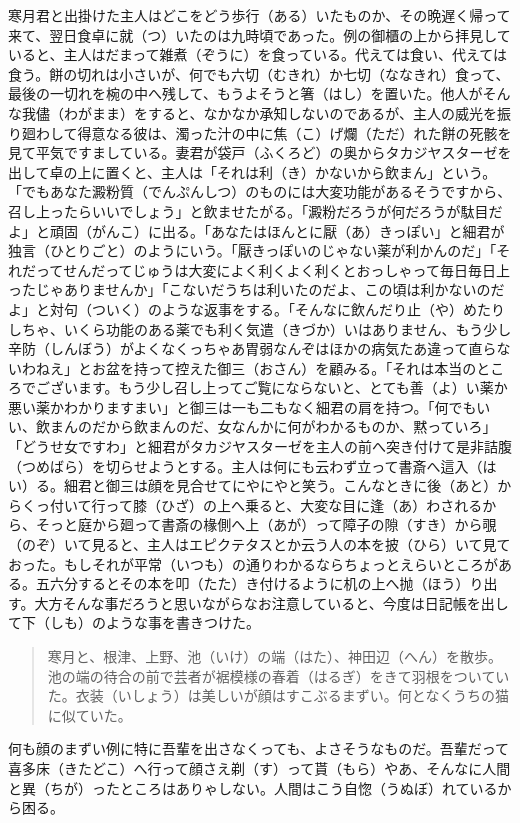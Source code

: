 \documentclass{book}
\begin{document}
寒月君と出掛けた主人はどこをどう歩行（ある）いたものか、その晩遅く帰って来て、翌日食卓に就（つ）いたのは九時頃であった。例の御櫃の上から拝見していると、主人はだまって雑煮（ぞうに）を食っている。代えては食い、代えては食う。餅の切れは小さいが、何でも六切（むきれ）か七切（ななきれ）食って、最後の一切れを椀の中へ残して、もうよそうと箸（はし）を置いた。他人がそんな我儘（わがまま）をすると、なかなか承知しないのであるが、主人の威光を振り廻わして得意なる彼は、濁った汁の中に焦（こ）げ爛（ただ）れた餅の死骸を見て平気ですましている。妻君が袋戸（ふくろど）の奥からタカジヤスターゼを出して卓の上に置くと、主人は「それは利（き）かないから飲まん」という。「でもあなた澱粉質（でんぷんしつ）のものには大変功能があるそうですから、召し上ったらいいでしょう」と飲ませたがる。「澱粉だろうが何だろうが駄目だよ」と頑固（がんこ）に出る。「あなたはほんとに厭（あ）きっぽい」と細君が独言（ひとりごと）のようにいう。「厭きっぽいのじゃない薬が利かんのだ」「それだってせんだってじゅうは大変によく利くよく利くとおっしゃって毎日毎日上ったじゃありませんか」「こないだうちは利いたのだよ、この頃は利かないのだよ」と対句（ついく）のような返事をする。「そんなに飲んだり止（や）めたりしちゃ、いくら功能のある薬でも利く気遣（きづか）いはありません、もう少し辛防（しんぼう）がよくなくっちゃあ胃弱なんぞはほかの病気たあ違って直らないわねえ」とお盆を持って控えた御三（おさん）を顧みる。「それは本当のところでございます。もう少し召し上ってご覧にならないと、とても善（よ）い薬か悪い薬かわかりますまい」と御三は一も二もなく細君の肩を持つ。「何でもいい、飲まんのだから飲まんのだ、女なんかに何がわかるものか、黙っていろ」「どうせ女ですわ」と細君がタカジヤスターゼを主人の前へ突き付けて是非詰腹（つめばら）を切らせようとする。主人は何にも云わず立って書斎へ這入（はい）る。細君と御三は顔を見合せてにやにやと笑う。こんなときに後（あと）からくっ付いて行って膝（ひざ）の上へ乗ると、大変な目に逢（あ）わされるから、そっと庭から廻って書斎の椽側へ上（あが）って障子の隙（すき）から覗（のぞ）いて見ると、主人はエピクテタスとか云う人の本を披（ひら）いて見ておった。もしそれが平常（いつも）の通りわかるならちょっとえらいところがある。五六分するとその本を叩（たた）き付けるように机の上へ抛（ほう）り出す。大方そんな事だろうと思いながらなお注意していると、今度は日記帳を出して下（しも）のような事を書きつけた。
\blockquote{寒月と、根津、上野、池（いけ）の端（はた）、神田辺（へん）を散歩。池の端の待合の前で芸者が裾模様の春着（はるぎ）をきて羽根をついていた。衣装（いしょう）は美しいが顔はすこぶるまずい。何となくうちの猫に似ていた。}
何も顔のまずい例に特に吾輩を出さなくっても、よさそうなものだ。吾輩だって喜多床（きたどこ）へ行って顔さえ剃（す）って貰（もら）やあ、そんなに人間と異（ちが）ったところはありゃしない。人間はこう自惚（うぬぼ）れているから困る。
\end{document}
